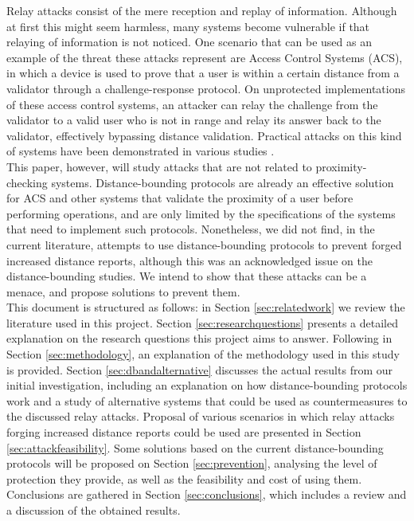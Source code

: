 \documentclass{article}
\begin{document}
Relay attacks consist of the mere reception and replay of information. Although at first this might seem harmless, many systems become vulnerable if that relaying of information is not noticed. One scenario that can be used as an example of the threat these attacks represent are Access Control Systems (ACS), in which a device is used to prove that a user is within a certain distance from a validator through a challenge-response protocol. On unprotected implementations of these access control systems, an attacker can relay the challenge from the validator to a valid user who is not in range and relay its answer back to the validator, effectively bypassing distance validation. Practical attacks on this kind of systems have been demonstrated in various studies \cite{francillon2011relay, francis2010practical, hancke2005practical, markantonakis2012practical}.\\

This paper, however, will study attacks that are not related to proximity-checking systems. Distance-bounding protocols are already an effective solution for ACS and other systems that validate the proximity of a user before performing operations, and are only limited by the specifications of the systems that need to implement such protocols. Nonetheless, we did not find, in the current literature, attempts to use distance-bounding protocols to prevent forged increased distance reports, although this was an acknowledged issue on the distance-bounding studies. We intend to show that these attacks can be a menace, and propose solutions to prevent them.\\

This document is structured as follows: in Section \ref{sec:relatedwork} we review the literature used in this project. Section \ref{sec:researchquestions} presents a detailed explanation on the research questions this project aims to answer. Following in Section \ref{sec:methodology}, an explanation of the methodology used in this study is provided. Section \ref{sec:dbandalternative} discusses the actual results from our initial investigation, including an explanation on how distance-bounding protocols work and a study of alternative systems that could be used as countermeasures to the discussed relay attacks. Proposal of various scenarios in which relay attacks forging increased distance reports could be used are presented in Section \ref{sec:attackfeasibility}. Some solutions based on the current distance-bounding protocols will be proposed on Section \ref{sec:prevention}, analysing the level of protection they provide, as well as the feasibility and cost of using them. Conclusions are gathered in Section \ref{sec:conclusions}, which includes a review and a discussion of the obtained results.\\
\end{document}

